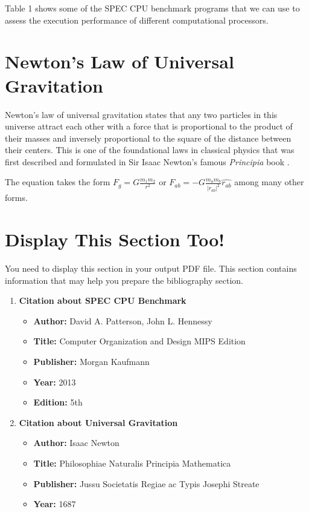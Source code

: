 \documentclass[11pt]{article}
\begin{document}
    Table 1 shows some of the SPEC CPU benchmark programs that we can use to assess
    the execution performance of different computational processors.
    
    \newpage
    
    \section*{Newton’s Law of Universal Gravitation}
    Newton’s law of universal gravitation states that any two particles in this universe attract
    each other with a force that is proportional to the product of their masses and inversely
    proportional to the square of the distance between their centers. This is one of the foundational laws in classical physics that was first described and formulated in Sir Isaac Newton’s
    famous \textit{Principia} book \cite{gravity} .
    
    The equation takes the form $F_g = G\frac{m_1m_2}{r^2}$ or $F_{ab} = -G\frac{m_am_b}{|r_{ab}|^2}\hat{r_{ab}} $ among many other forms.
    
    \section*{Display This Section Too!}
    You need to display this section in your output PDF file. This section contains information
    that may help you prepare the bibliography section.
    
    \begin{enumerate}
    	\item \textbf{Citation about SPEC CPU Benchmark} 
    	\begin{itemize}
    		\item \textbf{Author:} David A. Patterson, John L. Hennessy
    		\item \textbf{Title:} Computer Organization and Design MIPS Edition
    		\item \textbf{Publisher:} Morgan Kaufmann
    		\item \textbf{Year:} 2013
    		\item \textbf{Edition:} 5th
    	\end{itemize}
    	
    	\item \textbf{Citation about Universal Gravitation}
    	\begin{itemize}
    		\item \textbf{Author:} Isaac Newton
    		\item \textbf{Title:} Philosophiae Naturalis Principia Mathematica
    		\item \textbf{Publisher:} Jussu Societatis Regiae ac Typis Josephi Streate
    		\item \textbf{Year:} 1687
    	\end{itemize}

    \end{enumerate}
    
    
    
\end{document}
